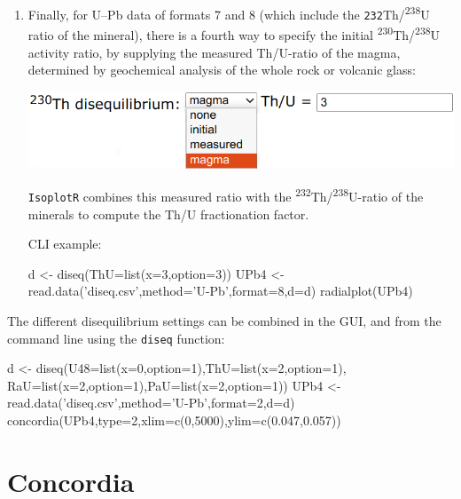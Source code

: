 \begin{refsection}
\begin{enumerate}
\begin{enumerate}
\item Finally, for U--Pb data of formats 7 and 8 (which include the
  \texttt{232}Th/\textsuperscript{238}U ratio of the mineral), there
  is a fourth way to specify the initial
  \textsuperscript{230}Th/\textsuperscript{238}U activity ratio, by
  supplying the measured Th/U-ratio of the magma, determined by
  geochemical analysis of the whole rock or volcanic glass:

\noindent\begin{minipage}[t]{.6\linewidth}
    \strut\vspace*{-\baselineskip}\newline
    \includegraphics[width=\linewidth]{../figures/Th230-disequilibrium.png}
  \end{minipage}
  \begin{minipage}[t]{.4\linewidth}
    \texttt{IsoplotR} combines this measured ratio with the
    \textsuperscript{232}Th/\textsuperscript{238}U-ratio of the
    minerals to compute the Th/U fractionation factor.
  \end{minipage}

\noindent CLI example:
\begin{script}
d <- diseq(ThU=list(x=3,option=3))
UPb4 <- read.data('diseq.csv',method='U-Pb',format=8,d=d)
radialplot(UPb4)
\end{script}

\end{enumerate}

The different disequilibrium settings can be combined in the GUI, and
from the command line using the \texttt{diseq} function:

\begin{script}
d <- diseq(U48=list(x=0,option=1),ThU=list(x=2,option=1),
           RaU=list(x=2,option=1),PaU=list(x=2,option=1))
UPb4 <- read.data('diseq.csv',method='U-Pb',format=2,d=d)
concordia(UPb4,type=2,xlim=c(0,5000),ylim=c(0.047,0.057))
\end{script}

\end{enumerate}

\section{Concordia} \label{sec:concordia-R}


\end{refsection}
